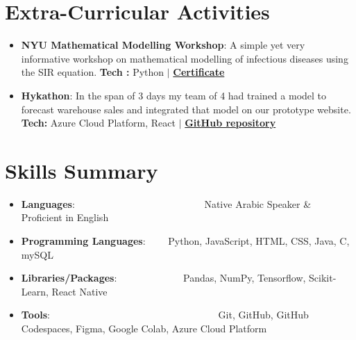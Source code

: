 \documentclass[a4paper,30pt]{article}
\newcommand{\resumeItem}[2] {
	\item\small{
		\textbf{#1}{: #2 \vspace{-2pt}}
	}
}
\newcommand{\resumeSubItem}[2]{\resumeItem{#1}{#2}\vspace{-3pt}}
\newcommand{\resumeSubHeadingListStart}{\begin{itemize}[leftmargin=*]}
\newcommand{\resumeSubHeadingListEnd}{\end{itemize}}
\begin{document}
\section{Extra-Curricular Activities}
	\resumeSubHeadingListStart
        \resumeSubItem{NYU Mathematical Modelling Workshop}{ A simple yet very informative workshop on mathematical modelling of infectious diseases using the SIR equation. \textbf{Tech : } Python $\vert$
        \href{https://github.com/asa30/My-Certificates/blob/main/NYU-Mathematical\%20Modeling\%20Workshop\%20on\%20the\%202nd\%20-\%20Ahmed\%20Sherif\%20Abdelfattah.pdf}{\textbf{Certificate}}
        }
		\resumeSubItem{Hykathon}{ In the span of 3 days my team of 4 had trained a model to forecast warehouse sales and integrated that model on our prototype website.  \textbf{Tech:} Azure Cloud Platform, React $\vert$ \href{https://github.com/AhmedElZubair38/Hykathon}{\textbf{GitHub repository}}}
	\resumeSubHeadingListEnd
	\vspace{-5pt}

\section{Skills Summary}
	\resumeSubHeadingListStart
            \resumeSubItem{Languages}{~~~~~~~~~~~~~~~~~~~~~~~~~~Native Arabic Speaker \& Proficient in English}
		\resumeSubItem{Programming Languages}{~~~~Python, JavaScript, HTML, CSS, Java, C, mySQL}
        \resumeSubItem{Libraries/Packages}{~~~~~~~~~~~~~Pandas, NumPy, Tensorflow, Scikit-Learn, React Native}
		\resumeSubItem{Tools}{~~~~~~~~~~~~~~~~~~~~~~~~~~~~~~~~~~Git, GitHub, GitHub Codespaces, Figma, Google Colab, Azure Cloud Platform}
	\resumeSubHeadingListEnd

\end{document}
